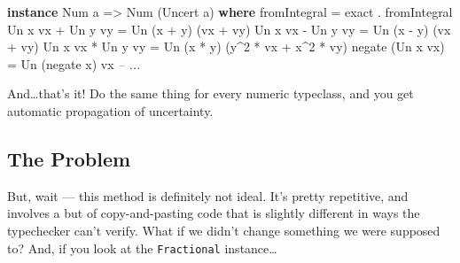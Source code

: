 \documentclass[]{article}
\newenvironment{Shaded}{}{}
\newcommand{\CommentTok}[1]{\textcolor[rgb]{0.38,0.63,0.69}{\textit{#1}}}
\newcommand{\DataTypeTok}[1]{\textcolor[rgb]{0.56,0.13,0.00}{#1}}
\newcommand{\DecValTok}[1]{\textcolor[rgb]{0.25,0.63,0.44}{#1}}
\newcommand{\FunctionTok}[1]{\textcolor[rgb]{0.02,0.16,0.49}{#1}}
\newcommand{\KeywordTok}[1]{\textcolor[rgb]{0.00,0.44,0.13}{\textbf{#1}}}
\newcommand{\NormalTok}[1]{#1}
\newcommand{\OtherTok}[1]{\textcolor[rgb]{0.00,0.44,0.13}{#1}}
\begin{document}
\begin{Shaded}
\begin{Highlighting}[]
\KeywordTok{instance} \DataTypeTok{Num}\NormalTok{ a }\OtherTok{=>} \DataTypeTok{Num}\NormalTok{ (}\DataTypeTok{Uncert}\NormalTok{ a) }\KeywordTok{where}
\NormalTok{    fromIntegral      }\FunctionTok{=}\NormalTok{ exact }\FunctionTok{.}\NormalTok{ fromIntegral}
    \DataTypeTok{Un}\NormalTok{ x vx }\FunctionTok{+} \DataTypeTok{Un}\NormalTok{ y vy }\FunctionTok{=} \DataTypeTok{Un}\NormalTok{ (x }\FunctionTok{+}\NormalTok{ y)    (vx }\FunctionTok{+}\NormalTok{ vy)}
    \DataTypeTok{Un}\NormalTok{ x vx }\FunctionTok{-} \DataTypeTok{Un}\NormalTok{ y vy }\FunctionTok{=} \DataTypeTok{Un}\NormalTok{ (x }\FunctionTok{-}\NormalTok{ y)    (vx }\FunctionTok{+}\NormalTok{ vy)}
    \DataTypeTok{Un}\NormalTok{ x vx }\FunctionTok{*} \DataTypeTok{Un}\NormalTok{ y vy }\FunctionTok{=} \DataTypeTok{Un}\NormalTok{ (x }\FunctionTok{*}\NormalTok{ y)    (y}\FunctionTok{^}\DecValTok{2} \FunctionTok{*}\NormalTok{ vx }\FunctionTok{+}\NormalTok{ x}\FunctionTok{^}\DecValTok{2} \FunctionTok{*}\NormalTok{ vy)}
\NormalTok{    negate (}\DataTypeTok{Un}\NormalTok{ x vx)  }\FunctionTok{=} \DataTypeTok{Un}\NormalTok{ (negate x) vx}
    \CommentTok{-- ...}
\end{Highlighting}
\end{Shaded}

And\ldots{}that's it! Do the same thing for every numeric typeclass, and you get
automatic propagation of uncertainty.

\hypertarget{the-problem}{%
\subsection{The Problem}\label{the-problem}}

But, wait --- this method is definitely not ideal. It's pretty repetitive, and
involves a but of copy-and-pasting code that is slightly different in ways the
typechecker can't verify. What if we didn't change something we were supposed
to? And, if you look at the \texttt{Fractional} instance\ldots{}
\end{document}
